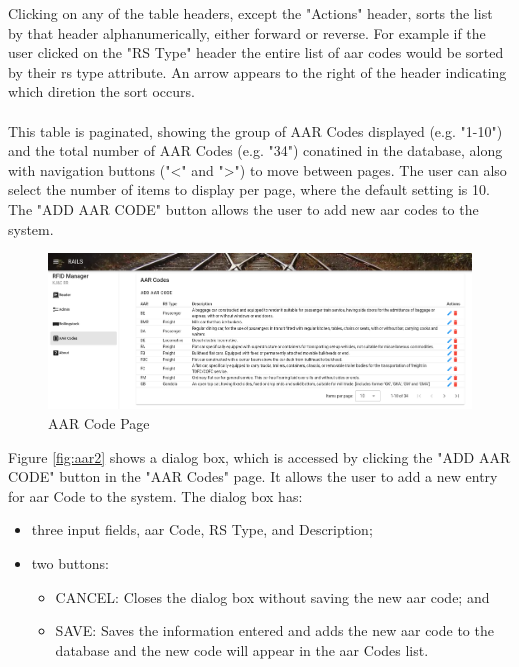Clicking on any of the table headers, except the "Actions" header, sorts the list by that header alphanumerically, either forward or reverse. For example 
if the user clicked on the "RS Type" header the entire list of \gls{aar} codes would be sorted by their \gls{rs} type attribute. An arrow appears 
to the right of the header indicating which diretion the sort occurs. \\
\\
This table is paginated, showing the group of AAR Codes displayed (e.g. "1-10") and the total number of AAR Codes (e.g. "34") conatined in the database, along 
with navigation buttons ("<" and ">") to move between pages. The user can also select the number of items to display per page, where the default setting is 10.
The "ADD AAR CODE" button allows the user to add new \gls{aar} codes to the system.
   
\begin{figure}[H]
    \centering
    \includegraphics[scale=0.33]{./images/aar.png}
    \caption{AAR Code Page}
    \label{fig:aar1}
\end{figure}

Figure \ref{fig:aar2} shows a dialog box, which is accessed by clicking the "ADD AAR CODE" button in the "AAR Codes" page. It allows the user to add 
a new entry for \gls{aar} Code to the system. 
The dialog box has:
\begin{itemize}
    \item three input fields, \gls{aar} Code, RS Type, and Description;
    \item two buttons:
    \begin{itemize}
        \item CANCEL: Closes the dialog box without saving the new \gls{aar} code; and
        \item SAVE: Saves the information entered and adds the new \gls{aar} code to the database and the new code will appear in the \gls{aar} Codes list.
    \end{itemize}
\end{itemize} 

